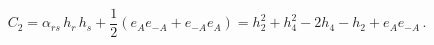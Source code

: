 \begin{equation}\label{b}
  C_2 = \alpha_{rs} \, h_r \, h_s + \frac{1}{2} (e_A e_{-A} +
  e_{-A} e_{A} ) = h^2_2 + h^2_4 - 2h_4
  -h_2 + e_A e_{-A}  \, .
\end{equation}

